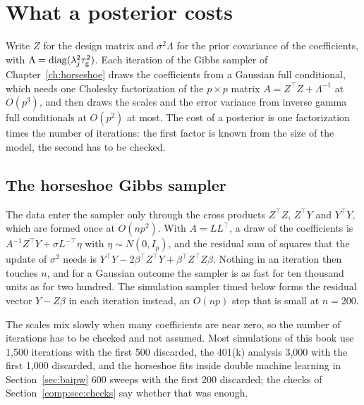 \section{What a posterior costs}\label{comp:sec:cost}

Write $Z$ for the design matrix and $\sigma^2\Lambda$ for the prior covariance of the coefficients, with $\Lambda=\mathrm{diag}(\lambda_j^2\tau_{\mathrm{g}}^2)$. Each iteration of the Gibbs sampler of Chapter~\ref{ch:horseshoe} draws the coefficients from a Gaussian full conditional, which needs one Cholesky factorization of the $p\times p$ matrix $A=Z^\top Z+\Lambda^{-1}$ at $O(p^3)$, and then draws the scales and the error variance from inverse gamma full conditionals at $O(p^2)$ at most. The cost of a posterior is one factorization times the number of iterations: the first factor is known from the size of the model, the second has to be checked.

\subsection{The horseshoe Gibbs sampler}\label{sec:hsgibbs}

The data enter the sampler only through the cross products $Z^\top Z$, $Z^\top Y$ and $Y^\top Y$, which are formed once at $O(np^2)$. With $A = LL^\top$, a draw of the coefficients is $A^{-1}Z^\top Y + \sigma L^{-\top}\eta$ with $\eta \sim N(0, I_p)$, and the residual sum of squares that the update of $\sigma^2$ needs is $Y^\top Y - 2\beta^\top Z^\top Y + \beta^\top Z^\top Z \beta$. Nothing in an iteration then touches $n$, and for a Gaussian outcome the sampler is as fast for ten thousand units as for two hundred. The simulation sampler timed below forms the residual vector $Y - Z\beta$ in each iteration instead, an $O(np)$ step that is small at $n = 200$.

The scales mix slowly when many coefficients are near zero, so the number of iterations has to be checked and not assumed. Most simulations of this book use 1,500 iterations with the first 500 discarded, the 401(k) analysis 3,000 with the first 1,000 discarded, and the horseshoe fits inside double machine learning in Section~\ref{sec:baipw} 600 sweeps with the first 200 discarded; the checks of Section~\ref{comp:sec:checks} say whether that was enough.

